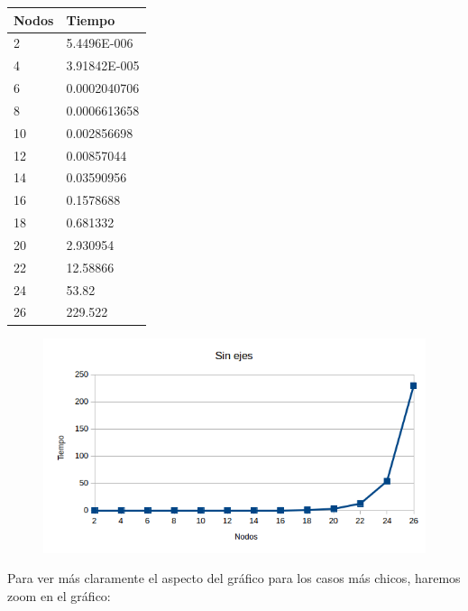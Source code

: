 \begin{tabular}{| l | l |}
 \hline
Nodos & Tiempo \\ \hline
2 & 5.4496E-006 \\ \hline
4 & 3.91842E-005 \\ \hline
6 & 0.0002040706 \\ \hline
8 & 0.0006613658 \\ \hline
10 &  0.002856698 \\ \hline
12 &  0.00857044 \\ \hline
14 &  0.03590956 \\ \hline
16 &  0.1578688 \\ \hline
18 &  0.681332 \\ \hline
20 &  2.930954 \\ \hline
22 &  12.58866 \\ \hline
24 &  53.82 \\ \hline
26 &  229.522 \\ \hline
\end{tabular}


   \begin{figure}[h!]
   \begin{center}
 	\includegraphics[scale=0.7]{imagenes/exacto/Vacios.png}
   \end{center}
 \end{figure}
 
Para ver m\'as claramente el aspecto del gr\'afico para los casos m\'as chicos, haremos zoom en el gr\'afico:\\

